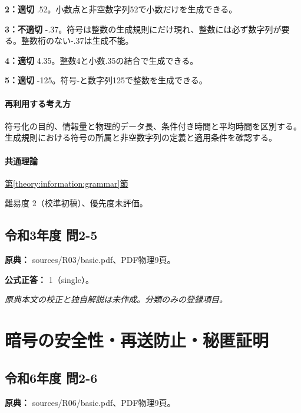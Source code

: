 \noindent\textbf{2：適切} .52。小数点と非空数字列52で小数だけを生成できる。\par

\noindent\textbf{3：不適切} -.37。符号は整数の生成規則にだけ現れ、整数には必ず数字列が要る。整数桁のない-.37は生成不能。\par

\noindent\textbf{4：適切} 4.35。整数4と小数.35の結合で生成できる。\par

\noindent\textbf{5：適切} -125。符号-と数字列125で整数を生成できる。\par

\paragraph{再利用する考え方} 符号化の目的、情報量と物理的データ長、条件付き時間と平均時間を区別する。生成規則における符号の所属と非空数字列の定義と適用条件を確認する。

\paragraph{共通理論} \hyperref[theory:information:grammar]{第\ref*{theory:information:grammar}節}

\par 難易度 2（校準初稿）、優先度未評価。

\subsection{令和3年度 問2-5}
\label{q:r03-reg-basic-2-5}

\noindent\textbf{原典：} sources/R03/basic.pdf、PDF物理9頁。

\textbf{公式正答：} 1（single）。

\par\textit{原典本文の校正と独自解説は未作成。分類のみの登録項目。}

\section{暗号の安全性・再送防止・秘匿証明}

\subsection{令和6年度 問2-6}
\label{q:r06-reg-basic-2-6}

\noindent\textbf{原典：} sources/R06/basic.pdf、PDF物理9頁。

